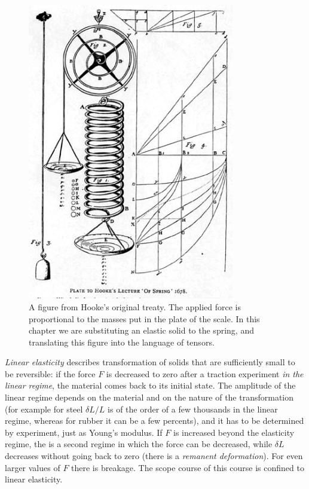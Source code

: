 \documentclass[DIV=12]{article}
\begin{document}
\begin{figure}
\begin{center}
\includegraphics[height=13cm]{HookeSpring.png}
\caption{A figure from Hooke's original treaty. The applied force is proportional to the masses put in the plate of the scale. In this chapter we are substituting an elastic solid to the spring, and translating this figure into the language of tensors.}
\end{center}
\label{HookeSpring}
\end{figure}
 {\emph{Linear elasticity}} describes transformation of solids that are sufficiently small 
 to be reversible: if the force $F$ is decreased to zero after a traction experiment {\emph{in the linear 
 regime}}, the material comes back to its initial state. The amplitude of the linear regime depends on the material and on the 
 nature of the transformation (for example for steel $\delta L /L$ is of the order of a few thousands in the
linear regime, whereas for rubber it can be a few percents), and it has to be determined
 by experiment, just as Young's modulus. If $F$ is increased beyond the elasticity regime, the is a second regime
 in which the force can be decreased, while $\delta L$ decreases without going back to zero (there is a {\emph{remanent deformation}}).
 For even larger values of $F$ there is breakage. The scope course of this course is confined
 to linear elasticity.\\
 
\end{document}
